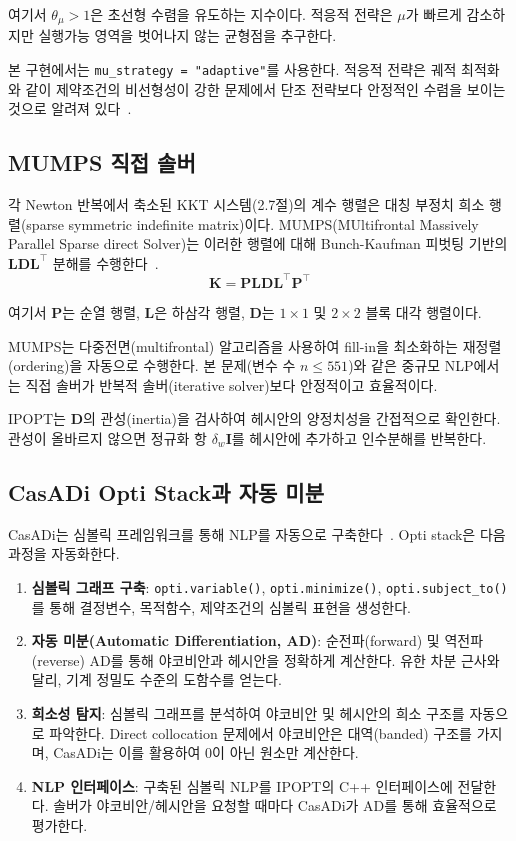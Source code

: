 \documentclass[11pt]{article}
\begin{document}
여기서 $\theta_\mu > 1$은 초선형 수렴을 유도하는 지수이다. 적응적 전략은 $\mu$가 빠르게 감소하지만 실행가능 영역을 벗어나지 않는 균형점을 추구한다.

본 구현에서는 \texttt{mu\_strategy = "adaptive"}를 사용한다. 적응적 전략은 궤적 최적화와 같이 제약조건의 비선형성이 강한 문제에서 단조 전략보다 안정적인 수렴을 보이는 것으로 알려져 있다~\cite{Betts2010}.

\subsection{MUMPS 직접 솔버}

각 Newton 반복에서 축소된 KKT 시스템(2.7절)의 계수 행렬은 대칭 부정치 희소 행렬(sparse symmetric indefinite matrix)이다. MUMPS(MUltifrontal Massively Parallel Sparse direct Solver)는 이러한 행렬에 대해 Bunch-Kaufman 피벗팅 기반의 $\mathbf{LDL}^\top$ 분해를 수행한다~\cite{Amestoy2001}.
%
\begin{equation}\label{eq:ldlt}
\mathbf{K} = \mathbf{P} \mathbf{L} \mathbf{D} \mathbf{L}^\top \mathbf{P}^\top
\end{equation}

여기서 $\mathbf{P}$는 순열 행렬, $\mathbf{L}$은 하삼각 행렬, $\mathbf{D}$는 $1 \times 1$ 및 $2 \times 2$ 블록 대각 행렬이다.

MUMPS는 다중전면(multifrontal) 알고리즘을 사용하여 fill-in을 최소화하는 재정렬(ordering)을 자동으로 수행한다. 본 문제(변수 수 $n \leq 551$)와 같은 중규모 NLP에서는 직접 솔버가 반복적 솔버(iterative solver)보다 안정적이고 효율적이다.

IPOPT는 $\mathbf{D}$의 관성(inertia)을 검사하여 헤시안의 양정치성을 간접적으로 확인한다. 관성이 올바르지 않으면 정규화 항 $\delta_w \mathbf{I}$를 헤시안에 추가하고 인수분해를 반복한다.

\subsection{CasADi Opti Stack과 자동 미분}

CasADi는 심볼릭 프레임워크를 통해 NLP를 자동으로 구축한다~\cite{Andersson2019}. Opti stack은 다음 과정을 자동화한다.

\begin{enumerate}[leftmargin=*]
  \item \textbf{심볼릭 그래프 구축}: \texttt{opti.variable()}, \texttt{opti.minimize()}, \texttt{opti.subject\_to()}를 통해 결정변수, 목적함수, 제약조건의 심볼릭 표현을 생성한다.
  \item \textbf{자동 미분(Automatic Differentiation, AD)}: 순전파(forward) 및 역전파(reverse) AD를 통해 야코비안과 헤시안을 정확하게 계산한다. 유한 차분 근사와 달리, 기계 정밀도 수준의 도함수를 얻는다.
  \item \textbf{희소성 탐지}: 심볼릭 그래프를 분석하여 야코비안 및 헤시안의 희소 구조를 자동으로 파악한다. Direct collocation 문제에서 야코비안은 대역(banded) 구조를 가지며, CasADi는 이를 활용하여 0이 아닌 원소만 계산한다.
  \item \textbf{NLP 인터페이스}: 구축된 심볼릭 NLP를 IPOPT의 C++ 인터페이스에 전달한다. 솔버가 야코비안/헤시안을 요청할 때마다 CasADi가 AD를 통해 효율적으로 평가한다.
\end{enumerate}
\end{document}
